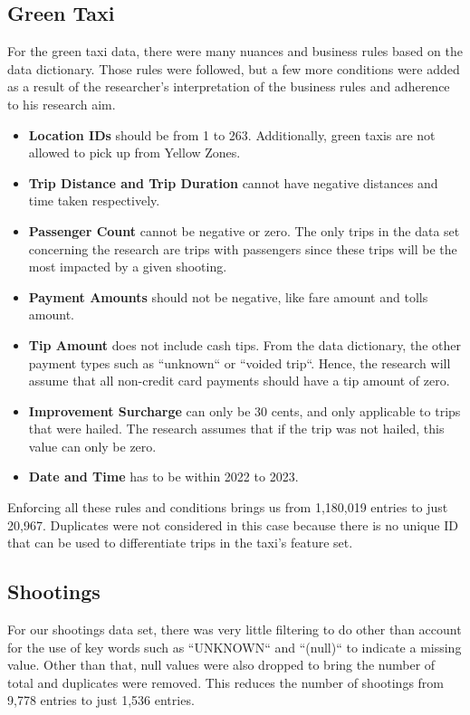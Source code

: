 \documentclass[11pt]{article}
\begin{document}
\subsection{Green Taxi}
For the green taxi data, there were many nuances and business rules based on the data dictionary. Those rules were followed, but a few more conditions were added as a result of the researcher's interpretation of the business rules and adherence to his research aim.
\begin{itemize}
    \item\textbf{Location IDs} should be from 1 to 263. Additionally, green taxis are not allowed to pick up from Yellow Zones.
    \item\textbf{Trip Distance and Trip Duration} cannot have negative distances and time taken respectively.
    \item\textbf{Passenger Count} cannot be negative or zero. The only trips in the data set concerning the research are trips with passengers since these trips will be the most impacted by a given shooting.
    \item \textbf{Payment Amounts} should not be negative, like fare amount and tolls amount.
    \item \textbf{Tip Amount} does not include cash tips. From the data dictionary, the other payment types such as ``unknown`` or ``voided trip``. Hence, the research will assume that all non-credit card payments should have a tip amount of zero.
    \item \textbf{Improvement Surcharge}  can only be 30 cents, and only applicable to trips that were hailed. The research assumes that if the trip was not hailed, this value can only be zero.
    \item \textbf{Date and Time} has to be within 2022 to 2023.
\end{itemize}

Enforcing all these rules and conditions brings us from 1,180,019 entries to just 20,967. Duplicates were not considered in this case because there is no unique ID that can be used to differentiate trips in the taxi's feature set.

\subsection{Shootings}
For our shootings data set, there was very little filtering to do other than account for the use of key words such as ``UNKNOWN`` and ``(null)`` to indicate a missing value. Other than that, null values were also dropped to bring the number of total and duplicates were removed. This reduces the number of shootings from 9,778 entries to just 1,536 entries.
\end{document}
